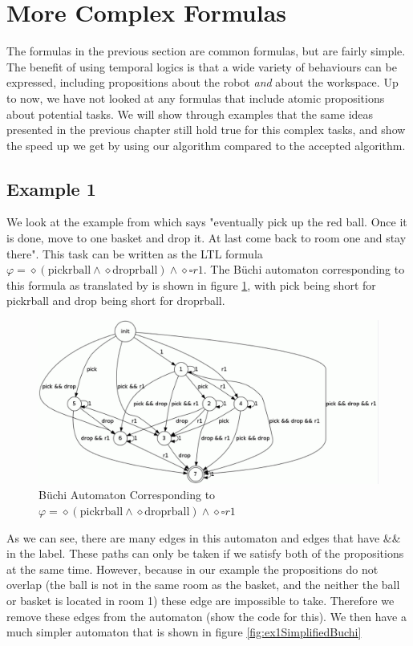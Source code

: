 \section{More Complex Formulas}
The formulas in the previous section are common formulas, but are fairly simple. The benefit of using temporal logics is that a wide variety of behaviours can be expressed, including propositions about the robot \textit{and} about the workspace. Up to now, we have not looked at any formulas that include atomic propositions about potential tasks. We will show through examples that the same ideas presented in the previous chapter still hold true for this complex tasks, and show the speed up we get by using our algorithm compared to the accepted algorithm. 

\subsection{Example 1}
We look at the example from \cite{guo15} which says "eventually pick up the red ball. Once it is done, move to one basket and drop it. At last come back to room one and stay there". This task can be written as the LTL formula $\varphi = \diamond (\text{pickrball} \wedge \diamond \text{droprball}) \wedge \diamond \square r1$. The B\"uchi automaton corresponding to this formula as translated by \cite{gastin01} is shown in figure \ref{fig:buchiEx1}, with pick being short for pickrball and drop being short for droprball.

\begin{figure}[!htb]
\centering
\includegraphics[scale=0.4]{buchiEx1_1}
\caption{B\"uchi Automaton Corresponding to $\varphi = \diamond (\text{pickrball} \wedge \diamond \text{droprball}) \wedge \diamond \square r1$}
\label{fig:buchiEx1}
\end{figure} 

As we can see, there are many edges in this automaton and edges that have \&\& in the label. These paths can only be taken if we satisfy both of the propositions at the same time. However, because in our example the propositions do not overlap (the ball is not in the same room as the basket, and the neither the ball or basket is located in room 1) these edge are impossible to take. Therefore we remove these edges from the automaton (show the code for this). We then have a much simpler automaton that is shown in figure \ref{fig:ex1SimplifiedBuchi}


